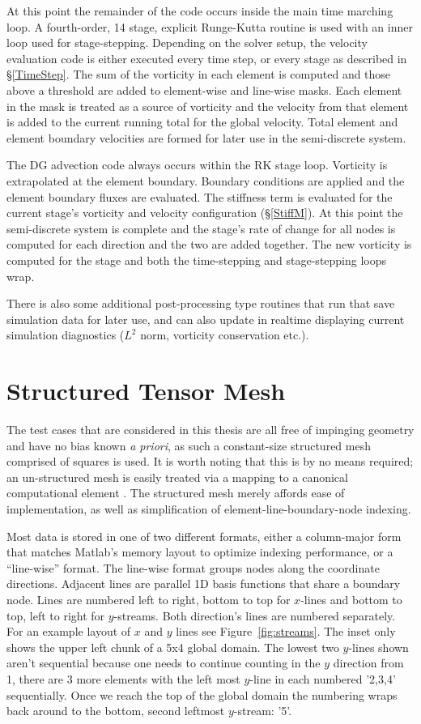 \documentclass[letterpaper,12pt]{report}
\begin{document}
At this point the remainder of the code occurs inside the main time marching loop. A fourth-order, 14 stage, explicit Runge-Kutta routine is used with an inner loop used for stage-stepping. Depending on the solver setup, the velocity evaluation code is either executed every time step, or every stage as described in \S\ref{TimeStep}. The sum of the vorticity in each element is computed and those above a threshold are added to element-wise and line-wise masks. Each element in the mask is treated as a source of vorticity and the velocity from that element is added to the current running total for the global velocity. Total element and element boundary velocities are formed for later use in the semi-discrete system.

The DG advection code always occurs within the RK stage loop. Vorticity is extrapolated at the element boundary. Boundary conditions are applied and the element boundary fluxes are evaluated. The stiffness term is evaluated for the current stage's vorticity and velocity configuration (\S\ref{StiffM}). At this point the semi-discrete system is complete and the stage's rate of change for all nodes is computed for each direction and the two are added together. The new vorticity is computed for the stage and both the time-stepping and stage-stepping loops wrap.

There is also some additional post-processing type routines that run that save simulation data for later use, and can also update in realtime displaying current simulation diagnostics ($L^2$ norm, vorticity conservation etc.).

%
\section{Structured Tensor Mesh}\label{NodeNum}
The test cases that are considered in this thesis are all free of impinging geometry and have no bias known \textit{a priori}, as such a constant-size structured mesh comprised of squares is used. It is worth noting that this is by no means required; an un-structured mesh is easily treated via a mapping to a canonical computational element \cite{Persson2013}. The structured mesh merely affords ease of implementation, as well as simplification of element-line-boundary-node indexing.

Most data is stored in one of two different formats, either a column-major form that matches Matlab's memory layout to optimize indexing performance, or a ``line-wise'' format. The line-wise format groups nodes along the coordinate directions. Adjacent lines are parallel 1D basis functions that share a boundary node. Lines are numbered left to right, bottom to top for $x$-lines and bottom to top, left to right for $y$-streams. Both direction's lines are numbered separately. For an example layout of $x$ and $y$ lines see Figure~\ref{fig:streams}. The inset only shows the upper left chunk of a 5x4 global domain. The lowest two $y$-lines shown aren't sequential because one needs to continue counting in the $y$ direction from 1, there are 3 more elements with the left most $y$-line in each numbered '2,3,4' sequentially. Once we reach the top of the global domain the numbering wraps back around to the bottom, second leftmost $y$-stream: '5'.
\end{document}
